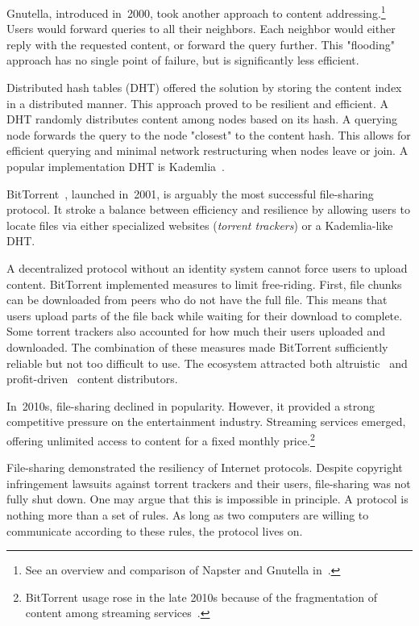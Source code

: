 Gnutella, introduced in~2000, took another approach to content addressing.\footnote{See an overview and comparison of Napster and Gnutella in~\cite{Saroiu2003}.}
Users would forward queries to all their neighbors.
Each neighbor would either reply with the requested content, or forward the query further.
This "flooding" approach has no single point of failure, but is significantly less efficient.

Distributed hash tables (DHT) offered the solution by storing the content index in a distributed manner.
This approach proved to be resilient and efficient.
A DHT randomly distributes content among nodes based on its hash.
A querying node forwards the query to the node "closest" to the content hash.
This allows for efficient querying and minimal network restructuring when nodes leave or join.
A popular implementation DHT is Kademlia~\cite{Maymounkov2002}.

BitTorrent~\cite{Pouwelse2005}, launched in~2001, is arguably the most successful file-sharing protocol.
It stroke a balance between efficiency and resilience by allowing users to locate files via either specialized websites (\textit{torrent trackers}) or a Kademlia-like DHT.

A decentralized protocol without an identity system cannot force users to upload content.
BitTorrent implemented measures to limit free-riding.
First, file chunks can be downloaded from peers who do not have the full file.
This means that users upload parts of the file back while waiting for their download to complete.
Some torrent trackers also accounted for how much their users uploaded and downloaded.
The combination of these measures made BitTorrent sufficiently reliable but not too difficult to use.
The ecosystem attracted both altruistic~\cite{Rehn2004} and profit-driven~\cite{Rumin2010} content distributors.

In~2010s, file-sharing declined in popularity.
However, it provided a strong competitive pressure on the entertainment industry.
Streaming services emerged, offering unlimited access to content for a fixed monthly price.\footnote{BitTorrent usage rose in the late 2010s because of the fragmentation of content among streaming services~\cite{Bode2018}.}

File-sharing demonstrated the resiliency of Internet protocols.
Despite copyright infringement lawsuits against torrent trackers and their users, file-sharing was not fully shut down.
One may argue that this is impossible in principle.
A protocol is nothing more than a set of rules.
As long as two computers are willing to communicate according to these rules, the protocol lives on.

